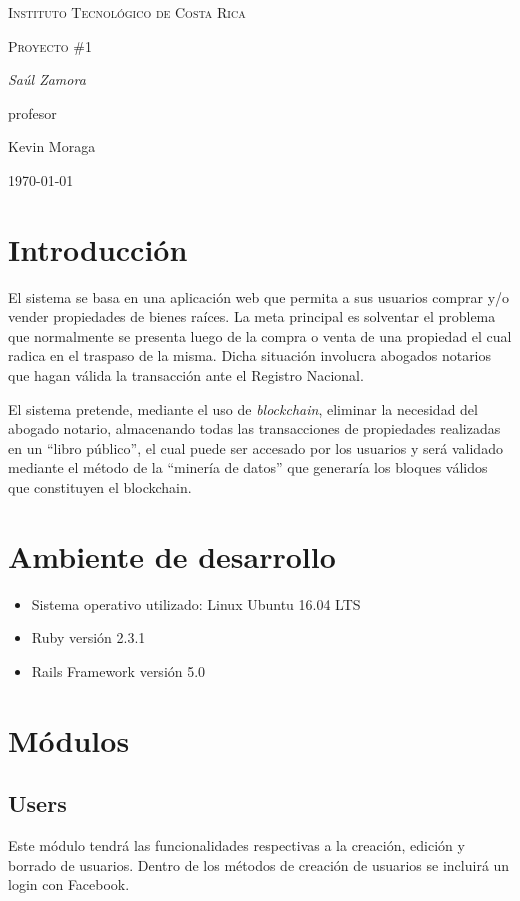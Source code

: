 \documentclass{article}
\begin{document}
\begin{titlepage}
  \centering
  {\scshape\LARGE Instituto Tecnol\'ogico de Costa Rica \par}
  \vspace{1cm}
  {\scshape\Large Proyecto \#1\par}
  \vspace{1.5cm}
  {\Large\itshape Sa\'ul Zamora\par}
  \vfill
  profesor\par
  Kevin Moraga \textsc{}

  \vfill

  {\large \today\par}
\end{titlepage}

\section{Introducci\'on}
El sistema se basa en una aplicaci\'on web que permita a sus usuarios comprar y/o vender propiedades de bienes ra\'ices. La meta principal es solventar el problema que normalmente se presenta luego de la compra o venta de una propiedad el cual radica en el traspaso de la misma. Dicha situaci\'on involucra abogados notarios que hagan v\'alida la transacci\'on ante el Registro Nacional.

El sistema pretende, mediante el uso de \emph{blockchain}, eliminar la necesidad del abogado notario, almacenando todas las transacciones de propiedades realizadas en un ``libro p\'ublico'', el cual puede ser accesado por los usuarios y ser\'a validado mediante el m\'etodo de la ``miner\'ia de datos'' que generar\'ia los bloques v\'alidos que constituyen el blockchain.

\section{Ambiente de desarrollo}
\begin{itemize}
  \item Sistema operativo utilizado: Linux Ubuntu 16.04 LTS
  \item Ruby versi\'on 2.3.1
  \item Rails Framework versi\'on 5.0
\end{itemize}

\section{M\'odulos}
\subsection{Users}
Este m\'odulo tendr\'a las funcionalidades respectivas a la creaci\'on, edici\'on y borrado de usuarios. Dentro de los m\'etodos de creaci\'on de usuarios se incluir\'a un login con Facebook.
\end{document}
